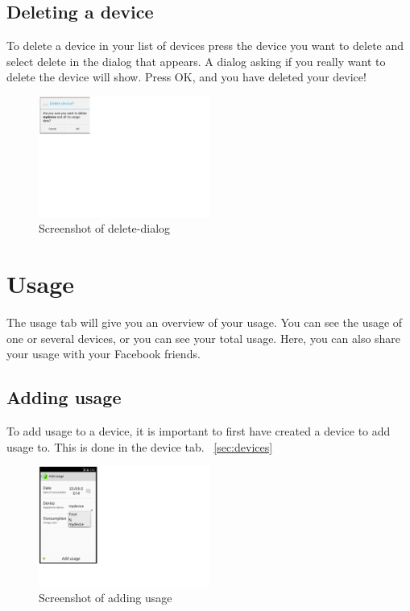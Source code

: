 \subsection{Deleting a device}
To delete a device in your list of devices press the device you want to delete and select delete in the dialog that appears. A dialog asking if you really want to delete the device will show. Press OK, and you have deleted your device!

\begin{figure}[H]
\centering
\includegraphics[width=0.5\textwidth, clip, trim=0cm 14cm 20cm 0cm]{appendix/usermanual/fig/ReallyDeleteDevice.png}
\caption{Screenshot of delete-dialog}
\end{figure}

\section{Usage}
The usage tab will give you an overview of your usage. You can see the usage of one or several devices, or you can see your total usage. Here, you can also share your usage with your Facebook friends.
\subsection{Adding usage}
To add usage to a device, it is important to first have created a device to add usage to. This is done in the device tab. ~\ref{sec:devices}

\begin{figure}[H]
\centering
\includegraphics[width=0.5\textwidth, clip, trim=0cm 4cm 19.5cm 0cm]{appendix/usermanual/fig/AddUsage.png}
\caption{Screenshot of adding usage}
\end{figure}


